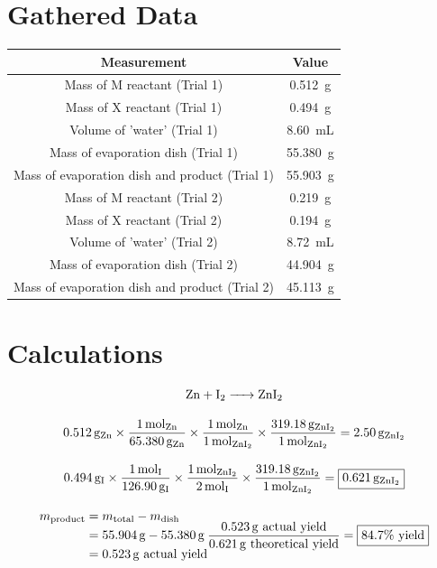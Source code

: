 \documentclass[titlepage]{article}
\begin{document}
\section{Gathered Data}
\begin{tabular}{ |c|c| }
    \hline
    Measurement & Value \\
    \hline
    Mass of M reactant (Trial 1) &  \qty{0.512}{\gram}\\
    Mass of X reactant (Trial 1) & \qty{0.494}{\gram} \\
    Volume of 'water' (Trial 1) & \qty{8.60}{\milli\liter} \\
    Mass of evaporation dish (Trial 1) & \qty{55.380}{\gram} \\
    Mass of evaporation dish and product (Trial 1) & \qty{55.903}{\gram} \\
    Mass of M reactant (Trial 2) & \qty{0.219}{\gram} \\
    Mass of X reactant (Trial 2) & \qty{0.194}{\gram} \\
    Volume of 'water' (Trial 2) & \qty{8.72}{\milli\liter} \\
    Mass of evaporation dish (Trial 2) & \qty{44.904}{\gram} \\
    Mass of evaporation dish and product (Trial 2) & \qty{45.113}{\gram} \\
    \hline
    \end{tabular}
\section{Calculations}
\begin{gather*}
    \ce{Zn + I2 -> ZnI2} \\[2ex]
    \qty{0.512}{\gram\of{Zn}}\times\frac{\qty{1}{\mol\of{Zn}}}{\qty{65.380}{\gram\of{Zn}}}\times\frac{\qty{1}{\mol\of{Zn}}}{\qty{1}{\mol\of{\ce{ZnI2}}}}\times\frac{\qty{319.18}{\gram\of{\ce{ZnI2}}}}{\qty{1}{\mol\of{\ce{ZnI2}}}}=\qty{2.50}{\gram\of{\ce{ZnI2}}} \\[2ex]
    \qty{0.494}{\gram\of{I}}\times\frac{\qty{1}{\mol\of{I}}}{\qty{126.90}{\gram\of{I}}}\times\frac{\qty{1}{\mol\of{\ce{ZnI2}}}}{\qty{2}{\mol\of{I}}}\times\frac{\qty{319.18}{\gram\of{\ce{ZnI2}}}}{\qty{1}{\mol\of{\ce{ZnI2}}}}=\boxed{\qty{0.621}{\gram\of{\ce{ZnI2}}}} \\[2ex]
    \begin{split}
    m_{\text{product}} &= m_{\text{total}} - m_{\text{dish}} \\
                       &= \qty{55.904}{\gram} - \qty{55.380}{\gram} \\
                       &= \qty{0.523}{\gram} \text{ actual yield} \\
    \end{split}
    \frac{\qty{0.523}{\gram}\mathrm{\ actual\ yield}}{\qty{0.621}{\gram}\mathrm{\ theoretical\ yield}}=\boxed{84.7\unit{\percent}\mathrm{\ yield}}
\end{gather*}
\end{document}

